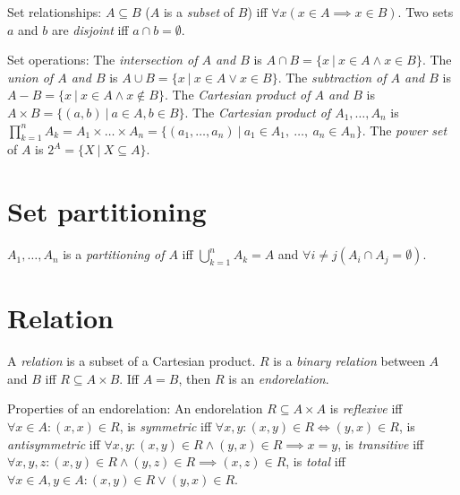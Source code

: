 Set relationships:
%
\(A \subseteq B\)
(\(A\) is a \emph{subset} of \(B\))
iff \(\forall x (x \in A \implies x \in B)\).
%
%
Two sets \(a\) and \(b\) are \emph{disjoint} iff \(a \cap b = \emptyset\).

Set operations:
%
%
The \emph{intersection of \(A\) and \(B\)} is
\(A \cap B = \{ x ~|~ x \in A \wedge x \in B \}\).
%
%
The \emph{union of \(A\) and \(B\)} is
\(A \cup B = \{ x ~|~ x \in A \vee x \in B \}\).
%
%
The \emph{subtraction of \(A\) and \(B\)} is
\(A - B = \{ x ~|~ x \in A \wedge x \not\in B \}\).
%
The \emph{Cartesian product of \(A\) and \(B\)} is \(A \times B = \{ (a,b) ~|~ a \in A, b \in B \}\).
The \emph{Cartesian product of \(A_1,\ldots,A_n\)} is
\(\prod_{k=1}^n A_k = A_1 \times \ldots \times A_n = \{ (a_1,\ldots,a_n) ~|~ a_1 \in A_1, ~\ldots, ~a_n \in A_n \}\).
%
%
The \emph{power set} of \(A\) is \(2^A = \{ X ~|~ X \subseteq A \}\).

\section{Set partitioning}

\(A_1,\ldots,A_n\) is a \emph{partitioning of \(A\)} iff
\(\bigcup_{k=1}^n A_k = A\) and
\(\forall i \neq j (A_i \cap A_j = \emptyset)\).

\section{Relation}

%
A \emph{relation} is a subset of a Cartesian product.
%
%
\(R\) is a \emph{binary relation} between \(A\) and \(B\) iff \(R \subseteq A \times B\).
Iff \(A = B\), then \(R\) is an \emph{endorelation}.

Properties of an endorelation:
%
%
An endorelation \(R \subseteq A \times A\) is \emph{reflexive} iff
\(\forall x \in A : (x,x) \in R\),
%
%
is \emph{symmetric} iff
\(\forall x,y: (x,y) \in R \iff (y,x) \in R\),
%
%
is \emph{antisymmetric} iff
\(\forall x,y: (x,y) \in R \wedge (y,x) \in R \implies x = y\),
%
%
is \emph{transitive} iff
\(\forall x,y,z: (x,y) \in R \wedge (y,z) \in R \implies (x,z) \in R\),
%
%
is \emph{total} iff
\(\forall x \in A , y \in A : (x,y) \in R \vee (y,x) \in R\).

